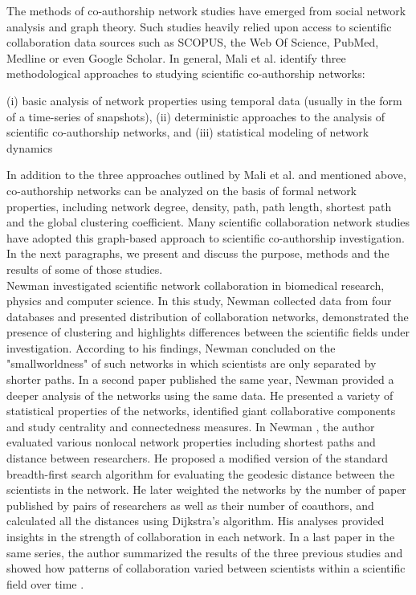 The methods of co-authorship network studies have emerged from social network analysis and graph theory. Such studies heavily relied upon access to scientific collaboration data sources such as SCOPUS, the Web Of Science, PubMed, Medline or even Google Scholar. In general, Mali et al. \cite{mali_dynamic_2012} identify three methodological approaches to studying scientific co-authorship networks:%
\begin{displayquote}
(i) basic analysis of network properties using temporal data (usually in the form of a time-series of snapshots), (ii) deterministic approaches to the analysis of scientific co-authorship networks, and (iii) statistical modeling of network dynamics
\end{displayquote}
In addition to the three approaches outlined by Mali et al. \cite{mali_dynamic_2012} and mentioned above, co-authorship networks can be analyzed on the basis of formal network properties, including network degree, density, path, path length, shortest path and the global clustering coefficient. Many scientific collaboration network studies have adopted this graph-based approach to scientific co-authorship investigation. In the next paragraphs, we present and discuss the purpose, methods and the results of some of those studies.\\
Newman \cite{newman_structure_2001} investigated scientific network collaboration in biomedical research, physics and computer science. In this study, Newman collected data from four databases and presented distribution of collaboration networks, demonstrated the presence of clustering and highlights differences between the scientific fields under investigation. According to his findings, Newman \cite{newman_structure_2001} concluded on the "smallworldness" of such networks in which scientists are only separated by shorter paths. In a second paper published the same year, Newman \cite{newman_scientific_2001} provided a deeper analysis of the networks using the same data. He presented a variety of statistical properties of the networks, identified giant collaborative components and study centrality and connectedness measures. In Newman \cite{newman_scientific_2001-1}, the author evaluated various nonlocal network properties including shortest paths and distance between researchers. He proposed a modified version of the standard breadth-first search algorithm for evaluating the geodesic distance between the scientists in the network. He later weighted the networks by the number of paper published by pairs of researchers as well as their number of coauthors, and calculated all the distances using Dijkstra's algorithm. His analyses provided insights in the strength of collaboration in each network. In a last paper in the same series, the author summarized the results of the three previous studies and showed how patterns of collaboration varied between scientists within a scientific field over time \cite{newman_coauthorship_2004}. \\
